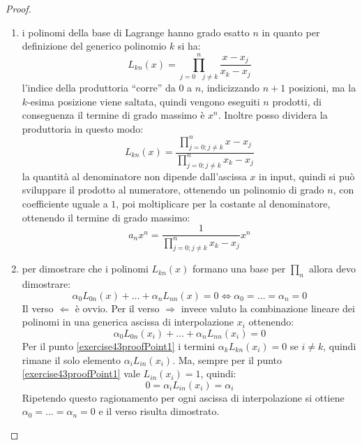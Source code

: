 \begin{proof}
\begin{enumerate}
  \item i polinomi della base di Lagrange hanno grado esatto $n$ in quanto per
  definizione del generico polinomio $k$ si ha:
  \begin{displaymath}
  	L_{kn}(x) = \prod_{j=0 \quad j \not = k}^{n}{\frac{x-x_{j}}{x_{k}-x_{j}}}
  \end{displaymath}
  l'indice della produttoria ``corre'' da $0$ a $n$, indicizzando $n+1$
  posizioni, ma la $k$-esima posizione viene saltata, quindi vengono eseguiti
  $n$ prodotti, di conseguenza il termine di grado massimo \`e $x^{n}$.
  Inoltre posso dividera la produttoria in questo modo:
  \begin{displaymath}
  	L_{kn}(x) = \frac{\prod_{j=0; j \not =
  	k}^{n}{x-x_{j}}}{\prod_{j=0; j \not =
  	k}^{n}{x_{k}-x_{j}}}
  \end{displaymath}
  la quantit\`a al denominatore non dipende dall'ascissa $x$ in input, quindi si
  pu\`o sviluppare il prodotto al numeratore, ottenendo un polinomio di grado
  $n$, con coefficiente uguale a $1$, poi moltiplicare per la costante al
  denominatore, ottenendo il termine di grado massimo:
  \begin{displaymath}
  	a_{n}x^{n} = \frac{1}{\prod_{j=0; j \not = k}^{n}{x_{k}-x_{j}}} x^{n}
  \end{displaymath}
  
  \item per dimostrare che i polinomi $L_{kn}(x)$ formano una base per  
  $\prod_{n}$ allora devo dimostrare:
  \begin{displaymath}
  	\alpha_{0}L_{0n}(x)+ \ldots + \alpha_{n}L_{nn}(x) = 0 \Leftrightarrow
  	\alpha_{0} = \ldots = \alpha_{n} = 0 
  \end{displaymath}
  Il verso $\Leftarrow$ \`e ovvio. Per il verso $\Rightarrow$ invece valuto
  la combinazione lineare dei polinomi in una generica ascissa di
  interpolazione $x_{i}$ ottenendo:
  \begin{displaymath}
  	\alpha_{0}L_{0n}(x_{i})+ \ldots + \alpha_{n}L_{nn}(x_{i}) = 0  
  \end{displaymath}
  Per il punto \ref{exercise43proofPoint1} i termini $\alpha_{k}L_{kn}(x_{i}) =
  0$ se $i \not = k$, quindi rimane il solo elemento $\alpha_{i}L_{in}(x_{i})$. 
  Ma, sempre per il punto \ref{exercise43proofPoint1} vale $L_{in}(x_{i}) = 1$,
  quindi:
  \begin{displaymath}
  	0 = \alpha_{i}L_{in}(x_{i}) = \alpha_{i}  
  \end{displaymath}
  Ripetendo questo ragionamento per ogni ascissa di interpolazione si ottiene
  $\alpha_{0} = \ldots = \alpha_{n} = 0$ e il verso risulta dimostrato.
\end{enumerate}
\end{proof}


